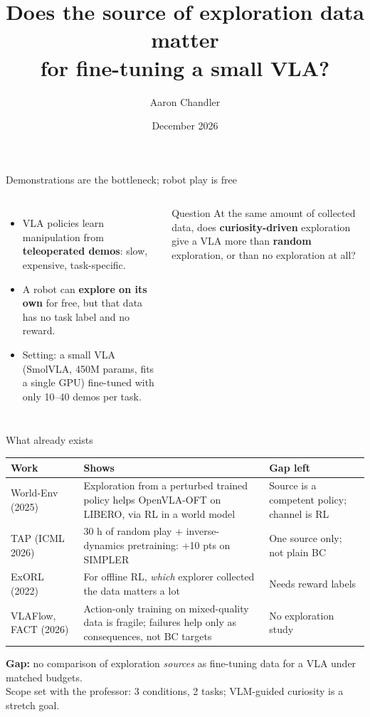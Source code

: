 \documentclass[aspectratio=169,11pt]{beamer}
\title{Does the source of exploration data matter\\for fine-tuning a small VLA?}
\author{Aaron Chandler}
\institute{CMPE 249 Intelligent Autonomous Systems \textbullet{} San Jos\'e State University\\[2pt]\texttt{github.com/AaronChandler976/curious-vla}}
\date{December 2026}
\begin{document}
\begin{frame}[plain]
\titlepage
\end{frame}

\begin{frame}{Demonstrations are the bottleneck; robot play is free}
\begin{columns}[T]
\begin{itemize}\setlength\itemsep{0.8em}
\item VLA policies learn manipulation from \textbf{teleoperated demos}: slow, expensive, task-specific.
\item A robot can \textbf{explore on its own} for free, but that data has no task label and no reward.
\item Setting: a small VLA (SmolVLA, 450M params, fits a single GPU) fine-tuned with only 10--40 demos per task.
\end{itemize}
\begin{block}{Question}
At the same amount of collected data, does \textbf{curiosity-driven} exploration give a VLA more than \textbf{random} exploration, or than no exploration at all?
\end{block}
\end{columns}
\end{frame}

\begin{frame}{What already exists}
\small
\begin{tabular}{@{}p{}p{}p{}@{}}
\toprule
\textbf{Work} & \textbf{Shows} & \textbf{Gap left} \\ \midrule
World-Env (2025) & Exploration from a perturbed trained policy helps OpenVLA-OFT on LIBERO, via RL in a world model & Source is a competent policy; channel is RL \\
TAP (ICML 2026) & 30 h of random play + inverse-dynamics pretraining: +10 pts on SIMPLER & One source only; not plain BC \\
ExORL (2022) & For offline RL, \emph{which} explorer collected the data matters a lot & Needs reward labels \\
VLAFlow, FACT (2026) & Action-only training on mixed-quality data is fragile; failures help only as consequences, not BC targets & No exploration study \\ \bottomrule
\end{tabular}
\vspace{0.8em}

\textbf{Gap:} no comparison of exploration \emph{sources} as fine-tuning data for a VLA under matched budgets.\\
\textcolor{muted}{Scope set with the professor: 3 conditions, 2 tasks; VLM-guided curiosity is a stretch goal.}
\end{frame}
\end{document}
